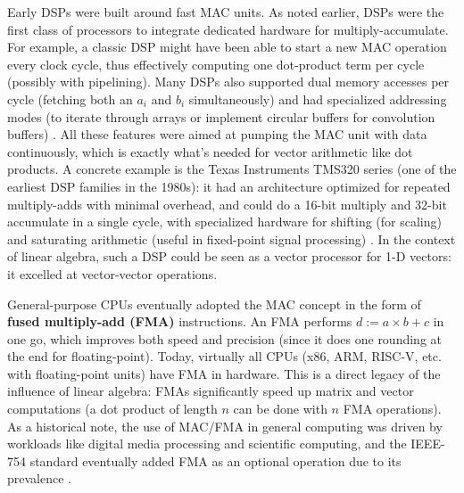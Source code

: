Early DSPs were built around fast MAC units. As noted earlier, DSPs were the first class of processors to integrate dedicated hardware for multiply-accumulate. For example, a classic DSP might have been able to start a new MAC operation every clock cycle, thus effectively computing one dot-product term per cycle (possibly with pipelining). Many DSPs also supported dual memory accesses per cycle (fetching both an $a_i$ and $b_i$ simultaneously) and had specialized addressing modes (to iterate through arrays or implement circular buffers for convolution buffers) \cite{savla2002dsp, allaboutcircuits2017circular}. All these features were aimed at pumping the MAC unit with data continuously, which is exactly what’s needed for vector arithmetic like dot products. A concrete example is the Texas Instruments TMS320 series (one of the earliest DSP families in the 1980s): it had an architecture optimized for repeated multiply-adds with minimal overhead, and could do a 16-bit multiply and 32-bit accumulate in a single cycle, with specialized hardware for shifting (for scaling) and saturating arithmetic (useful in fixed-point signal processing) \cite{texasinstruments1997tms320c54x}. In the context of linear algebra, such a DSP could be seen as a vector processor for 1-D vectors: it excelled at vector-vector operations.

General-purpose CPUs eventually adopted the MAC concept in the form of \textbf{fused multiply-add (FMA)} instructions. An FMA performs $d := a \times b + c$ in one go, which improves both speed and precision (since it does one rounding at the end for floating-point). Today, virtually all CPUs (x86, ARM, RISC-V, etc. with floating-point units) have FMA in hardware. This is a direct legacy of the influence of linear algebra: FMAs significantly speed up matrix and vector computations (a dot product of length $n$ can be done with $n$ FMA operations). As a historical note, the use of MAC/FMA in general computing was driven by workloads like digital media processing and scientific computing, and the IEEE-754 standard eventually added FMA as an optional operation due to its prevalence \cite{ieee754-1985, ieee754-2008, overton2001numerical}.

